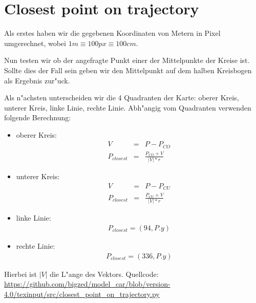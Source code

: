 \documentclass[10pt,oneside,a4paper]{article}
\begin{document}
  \section{Closest point on trajectory}
    Als erstes haben wir die gegebenen Koordinaten von Metern in Pixel umgerechnet, wobei \( 1m
    \equiv 100px \equiv 100cm \).

    Nun testen wir ob der angefragte Punkt einer der Mittelpunkte der Kreise ist. Sollte dies der
    Fall sein geben wir den Mittelpunkt auf dem halben Kreisbogen als Ergebnis zur"uck.

    Als n"achsten unterscheiden wir die 4 Quadranten der Karte: oberer Kreis, unterer Kreis, linke
    Linie, rechte Linie. Abh"angig vom Quadranten verwenden folgende Berechnung:
    \begin{itemize}
      \item{oberer Kreis:}
        \begin{eqnarray*}
          V & = & P - P_{CO} \\
          P_{closest} & = & \frac{P_{CO} + V}{|V| * r}
        \end{eqnarray*}
      \item{unterer Kreis:}
        \begin{eqnarray*}
          V & = & P - P_{CU} \\
          P_{closest} & = & \frac{P_{CU} + V}{|V| * r}
        \end{eqnarray*}
      \item{linke Linie:}
        \begin{eqnarray*}
          P_{closest} = (94, P.y)
        \end{eqnarray*}
      \item{rechte Linie:}
        \begin{eqnarray*}
          P_{closest} = (336, P.y)
        \end{eqnarray*}
    \end{itemize}
    Hierbei ist \( |V| \) die L"ange des Vektors. Quellcode:
    \url{https://github.com/bigzed/model_car/blob/version-4.0/texinput/src/closest_point_on_trajectory.py}
\end{document}
